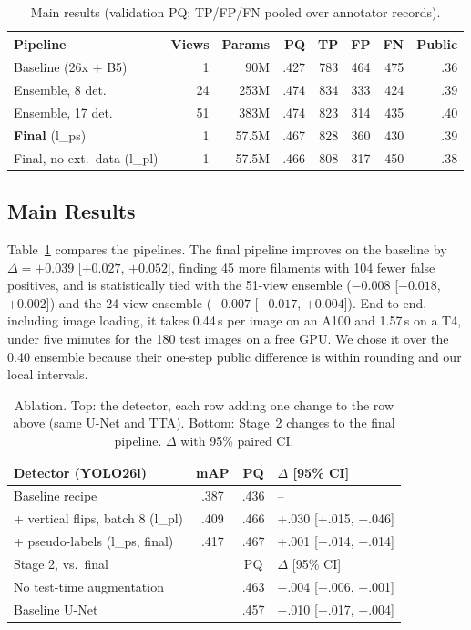 \documentclass[sigconf]{acmart}
\begin{document}
\begin{table}[t]
  \caption{Main results (validation PQ; TP/FP/FN pooled over annotator records).}
  \label{tab:main}
  \footnotesize
  \setlength{\tabcolsep}{2.5pt}
  \begin{tabular}{@{}lrrrrrrr@{}}
    \toprule
    Pipeline & Views & Params & PQ & TP & FP & FN & Public \\
    \midrule
    Baseline (26x + B5) & 1 & 90M & .427 & 783 & 464 & 475 & .36 \\
    Ensemble, 8 det. & 24 & 253M & .474 & 834 & 333 & 424 & .39 \\
    Ensemble, 17 det. & 51 & 383M & .474 & 823 & 314 & 435 & .40 \\
    \textbf{Final} (l\_ps) & 1 & 57.5M & .467 & 828 & 360 & 430 & .39 \\
    Final, no ext.\ data (l\_pl) & 1 & 57.5M & .466 & 808 & 317 & 450 & .38 \\
    \bottomrule
  \end{tabular}
\end{table}

\subsection{Main Results}
Table~\ref{tab:main} compares the pipelines. The final pipeline improves on the baseline by $\Delta = +0.039$ [$+0.027$, $+0.052$], finding 45 more filaments with 104 fewer false positives, and is statistically tied with the 51-view ensemble ($-0.008$ [$-0.018$, $+0.002$]) and the 24-view ensemble ($-0.007$ [$-0.017$, $+0.004$]). End to end, including image loading, it takes 0.44\,s per image on an A100 and 1.57\,s on a T4, under five minutes for the 180 test images on a free GPU. We chose it over the 0.40 ensemble because their one-step public difference is within rounding and our local intervals.

\begin{table}[t]
  \caption{Ablation. Top: the detector, each row adding one change to the row above (same U-Net and TTA). Bottom: Stage~2 changes to the final pipeline. $\Delta$ with 95\% paired CI.}
  \label{tab:ablation}
  \footnotesize
  \setlength{\tabcolsep}{3pt}
  \begin{tabular}{@{}lccl@{}}
    \toprule
    Detector (YOLO26l) & mAP & PQ & $\Delta$ [95\% CI] \\
    \midrule
    Baseline recipe & .387 & .436 & -- \\
    + vertical flips, batch 8 (l\_pl) & .409 & .466 & +.030 [+.015, +.046] \\
    + pseudo-labels (l\_ps, final) & .417 & .467 & +.001 [$-$.014, +.014] \\
    \midrule
    Stage 2, vs.\ final & & PQ & $\Delta$ [95\% CI] \\
    \midrule
    No test-time augmentation & & .463 & $-$.004 [$-$.006, $-$.001] \\
    Baseline U-Net & & .457 & $-$.010 [$-$.017, $-$.004] \\
    \bottomrule
  \end{tabular}
\end{table}
\end{document}
